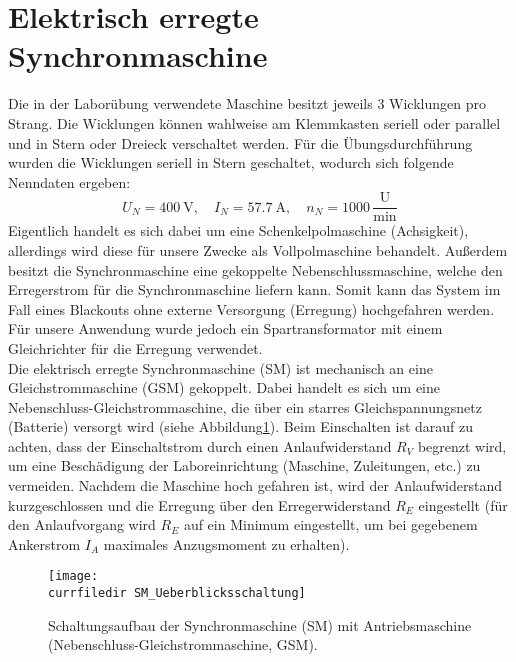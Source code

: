 \section{Elektrisch erregte Synchronmaschine}
Die in der Laborübung verwendete Maschine besitzt jeweils 3 Wicklungen pro Strang. Die Wicklungen können wahlweise am Klemmkasten seriell oder parallel und in Stern oder Dreieck verschaltet werden. Für die Übungsdurchführung wurden die Wicklungen seriell in Stern geschaltet, wodurch sich folgende Nenndaten ergeben:
\begin{equation*}
    U_N=\SI{400}{\volt}, \quad I_N = \SI{57.7}{\ampere}, \quad n_N = 1000\,\frac{\textrm{U}}{\textrm{min}}
\end{equation*}
Eigentlich handelt es sich dabei um eine Schenkelpolmaschine (Achsigkeit), allerdings wird diese für unsere Zwecke als Vollpolmaschine behandelt. Außerdem besitzt die Synchronmaschine eine gekoppelte Nebenschlussmaschine, welche den Erregerstrom für die Synchronmaschine liefern kann. Somit kann das System im Fall eines Blackouts ohne externe Versorgung (Erregung) hochgefahren werden. Für unsere Anwendung wurde jedoch ein Spartransformator mit einem Gleichrichter für die Erregung verwendet.\\
Die elektrisch erregte Synchronmaschine (SM) ist mechanisch an eine Gleichstrommaschine (GSM) gekoppelt. Dabei handelt es sich um eine Nebenschluss-Gleichstrommaschine, die über ein starres Gleichspannungsnetz (Batterie) versorgt wird (siehe Abbildung\;\ref{fig:SM_Ueberblicksschaltung}). Beim Einschalten ist darauf zu achten, dass der Einschaltstrom durch einen Anlaufwiderstand $R_V$ begrenzt wird, um eine Beschädigung der Laboreinrichtung (Maschine, Zuleitungen, etc.) zu vermeiden. Nachdem die Maschine hoch gefahren ist, wird der Anlaufwiderstand kurzgeschlossen und die Erregung über den Erregerwiderstand $R_E$ eingestellt (für den Anlaufvorgang wird $R_E$ auf ein Minimum eingestellt, um bei gegebenem Ankerstrom $I_A$ maximales Anzugsmoment zu erhalten).
\begin{figure}[htb]
    \centering
    \texttt{[image: \\currfiledir SM\_Ueberblicksschaltung]}
    \caption{Schaltungsaufbau der Synchronmaschine (SM) mit Antriebsmaschine (Nebenschluss-Gleichstrommaschine, GSM).}
    \label{fig:SM_Ueberblicksschaltung}
\end{figure}
